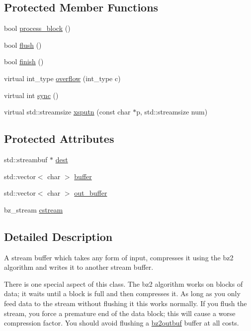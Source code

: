 \subsection*{Protected Member Functions}
\begin{DoxyCompactItemize}
\item 
bool \hyperlink{classbz2outbuf_af40665a45501362030a2bbda91da622f}{process\+\_\+block} ()
\item 
bool \hyperlink{classbz2outbuf_aec43fc6ec0468c2c688c851c15608883}{flush} ()
\item 
bool \hyperlink{classbz2outbuf_a867664ad9a778eabf5d64e5f7418b1cf}{finish} ()
\item 
virtual int\+\_\+type \hyperlink{classbz2outbuf_a5e272a380b209835fc3ddc30244bc819}{overflow} (int\+\_\+type c)
\item 
virtual int \hyperlink{classbz2outbuf_ae108159927323a49053efd36603a9e27}{sync} ()
\item 
virtual std\+::streamsize \hyperlink{classbz2outbuf_a6fc601d2a68654c045f650acedd450d9}{xsputn} (const char $\ast$p, std\+::streamsize num)
\end{DoxyCompactItemize}
\subsection*{Protected Attributes}
\begin{DoxyCompactItemize}
\item 
std\+::streambuf $\ast$ \hyperlink{classbz2outbuf_a44445968ae24691baabe3303e11dfe9a}{dest}
\item 
std\+::vector$<$ char $>$ \hyperlink{classbz2outbuf_ad5f7c46abb433b5fcc88e62849169cb9}{buffer}
\item 
std\+::vector$<$ char $>$ \hyperlink{classbz2outbuf_a8634b0224b7912495b80d02963573c65}{out\+\_\+buffer}
\item 
bz\+\_\+stream \hyperlink{classbz2outbuf_ab2010bc7f9fdd85a0fa988cf92cf7411}{cstream}
\end{DoxyCompactItemize}


\subsection{Detailed Description}
A stream buffer which takes any form of input, compresses it using the bz2 algorithm and writes it to another stream buffer. 

There is one special aspect of this class. The bz2 algorithm works on blocks of data; it waits until a block is full and then compresses it. As long as you only feed data to the stream without flushing it this works normally. If you flush the stream, you force a premature end of the data block; this will cause a worse compression factor. You should avoid flushing a \hyperlink{classbz2outbuf}{bz2outbuf} buffer at all costs. 


